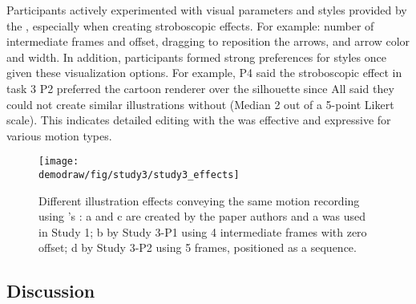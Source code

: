 %
%
Participants actively experimented with visual parameters and styles provided by the \phaseII{}, especially when creating stroboscopic effects. For example: number of intermediate frames and offset, dragging to reposition the arrows, and arrow color and width.
%
In addition, participants formed strong preferences for styles once given these visualization options. For example, P4 said the stroboscopic effect in task 3  P2 preferred the cartoon renderer over the silhouette since 
%
All said they could not create similar illustrations without \systemname{} (Median 2 out of a 5-point Likert scale).
%
This indicates  detailed editing with the \phaseII{} was effective and expressive for various motion types.

\begin{figure}[t]
  \centering
  \texttt{[image: \\demodraw/fig/study3/study3\_effects]}
  \caption{Different illustration effects conveying the same motion recording using \systemname{}'s \phaseII{}: a and c are created by the paper authors and a was used in Study 1; b by Study 3-P1 using 4 intermediate frames with zero offset; d by Study 3-P2 using 5 frames, positioned as a sequence.}
  \label{fig:study3_effects}
\end{figure}

\subsection {Discussion}

